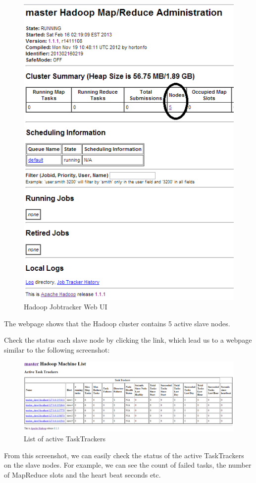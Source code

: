 \begin{figure}[h]
  \centering
  \includegraphics[width=.6\textwidth]{figs/5163os_03_02.png}
  \caption{Hadoop Jobtracker Web UI}\label{fig:jobtracker.webui}
\end{figure} 


The webpage shows that the Hadoop cluster contains 5 active slave nodes.

Check the status each slave node by clicking the link, which lead us to a webpage similar to the following screenshot:

\begin{figure}[h]
  \centering
  \includegraphics[width=.8\textwidth]{figs/5163os_03_03.png}
  \caption{List of active TaskTrackers}\label{fig:active.trackers}
\end{figure} 


From this screenshot, we can easily check the status of the active TaskTrackers on the slave nodes. For example, we can see the count of failed tasks, the number of MapReduce slots and the heart beat seconds etc.

